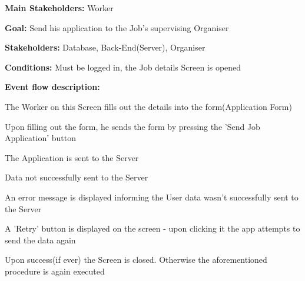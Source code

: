 				\noindent {}
				\begin{packed_item}
					\item \textbf{Main Stakeholders:} Worker
					\item \textbf{Goal:} Send his application to the Job's supervising Organiser
					\item \textbf{Stakeholders: } Database, Back-End(Server), Organiser
					\item \textbf{Conditions: } Must be logged in, the Job details Screen is opened
					\item \textbf{Event flow description: }
					\begin{packed_enum}
						\item The Worker on this Screen fills out the details into the form(Application Form)
						\item Upon filling out the form, he sends the form by pressing the 'Send Job Application' button
						\item The Application is sent to the Server
					\end{packed_enum}
					
					\begin{packed_item}
						\item[3.a] Data not successfully sent to the Server
						\item[] \begin{packed_enum}
							\item An error message is displayed informing the User data wasn't successfully sent to the Server
							\item A 'Retry' button is displayed on the screen - upon clicking it the app attempts to send the data again
							\item Upon success(if ever) the Screen is closed. Otherwise the aforementioned procedure is again executed
						\end{packed_enum}
					\end{packed_item}
				\end{packed_item}
			
